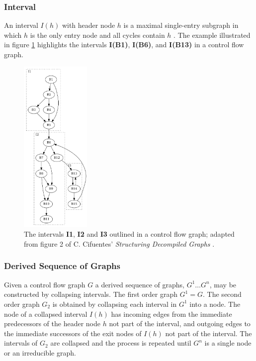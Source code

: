 
\subsubsection{Interval}

An interval $I(h)$ with header node $h$ is a maximal single-entry subgraph in which $h$ is the only entry node and all cycles contain $h$ \cite{structuring_algorithm_for_decompilation}. The example illustrated in figure \ref{fig:interval} highlights the intervals \textbf{I(B1)}, \textbf{I(B6)}, and \textbf{I(B13)} in a control flow graph.

\begin{figure}[htbp]
	\centering
	\includegraphics[width=0.3\textwidth]{inc/appendices/vocabulary/interval.png}
	\caption{The intervals \textbf{I1}, \textbf{I2} and \textbf{I3} outlined in a control flow graph; adapted from figure 2 of C. Cifuentes' \textit{Structuring Decompiled Graphs} \cite{structuring_decompiled_graphs}.}
	\label{fig:interval}
\end{figure}


\subsubsection{Derived Sequence of Graphs}

Given a control flow graph $G$ a derived sequence of graphs, $G^1 \dots G^n$, may be constructed by collapsing intervals. The first order graph $G^1 = G$. The second order graph $G_2$ is obtained by collapsing each interval in $G^1$ into a node. The node of a collapsed interval $I(h)$ has incoming edges from the immediate predecessors of the header node $h$ not part of the interval, and outgoing edges to the immediate successors of the exit nodes of $I(h)$ not part of the interval. The intervals of $G_2$ are collapsed and the process is repeated until $G^n$ is a single node or an irreducible graph.


